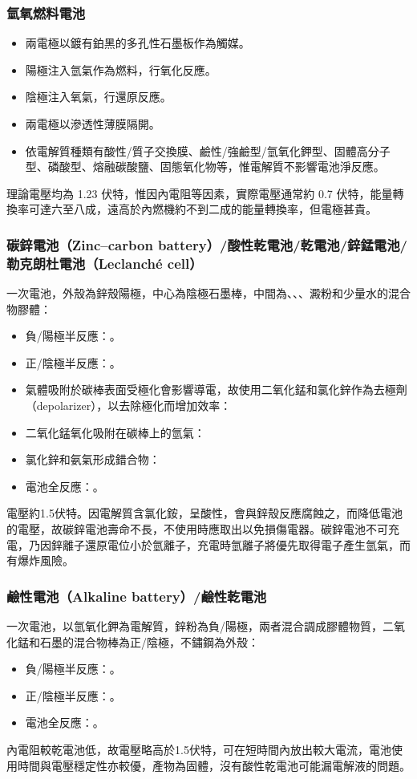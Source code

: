 \documentclass[a4paper,12pt]{report}
\begin{document}
\begin{itemize}
\begin{itemize}
\subsubsection{氫氧燃料電池}
\begin{itemize}
\item 兩電極以鍍有鉑黑的多孔性石墨板作為觸媒。
\item 陽極注入氫氣作為燃料，行氧化反應。
\item 陰極注入氧氣，行還原反應。
\item 兩電極以滲透性薄膜隔開。
\item 依電解質種類有酸性/質子交換膜、鹼性/強鹼型/氫氧化鉀型、固體高分子型、磷酸型、熔融碳酸鹽、固態氧化物等，惟電解質不影響電池淨反應。
\end{itemize}
理論電壓均為 1.23 伏特，惟因內電阻等因素，實際電壓通常約 0.7 伏特，能量轉換率可達六至八成，遠高於內燃機約不到二成的能量轉換率，但電極甚貴。
\subsubsection{碳鋅電池（Zinc–carbon battery）/酸性乾電池/乾電池/鋅錳電池/勒克朗杜電池（Leclanché cell） }
一次電池，外殼為鋅殼陽極，中心為陰極石墨棒，中間為、、、澱粉和少量水的混合物膠體：
\begin{itemize}
\item 負/陽極半反應：。
\item 正/陰極半反應：。
\item 氣體吸附於碳棒表面受極化會影響導電，故使用二氧化錳和氯化鋅作為去極劑（depolarizer），以去除極化而增加效率：
\bit
\item 二氧化錳氧化吸附在碳棒上的氫氣：
\item 氯化鋅和氨氣形成錯合物：
\eit
\item 電池全反應：。
\end{itemize}
電壓約1.5伏特。因電解質含氯化銨，呈酸性，會與鋅殼反應腐蝕之，而降低電池的電壓，故碳鋅電池壽命不長，不使用時應取出以免損傷電器。碳鋅電池不可充電，乃因鋅離子還原電位小於氫離子，充電時氫離子將優先取得電子產生氫氣，而有爆炸風險。
\subsubsection{鹼性電池（Alkaline battery）/鹼性乾電池}
一次電池，以氫氧化鉀為電解質，鋅粉為負/陽極，兩者混合調成膠體物質，二氧化錳和石墨的混合物棒為正/陰極，不鏽鋼為外殼：
\begin{itemize}
\item 負/陽極半反應：。
\item 正/陰極半反應：。
\item 電池全反應：。
\end{itemize}
內電阻較乾電池低，故電壓略高於1.5伏特，可在短時間內放出較大電流，電池使用時間與電壓穩定性亦較優，產物為固體，沒有酸性乾電池可能漏電解液的問題。

\end{itemize}
\end{itemize}
\end{document}
